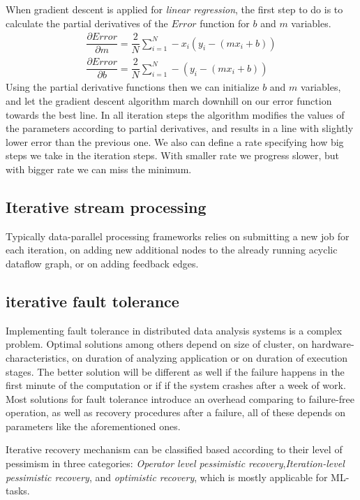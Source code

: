 When gradient descent is applied for \textit{linear regression}, the first step to do is to calculate the partial derivatives of the $Error$ function for  $b$ and $m$ variables.
\begin{align}
\dfrac{\partial Error}{\partial m} = \dfrac{2}{N}\sum_{i=1}^{N} -x_i(y_i-(mx_i+b)) \\
\dfrac{\partial Error}{\partial b} = \dfrac{2}{N}\sum_{i=1}^{N} -(y_i-(mx_i+b))
\end{align}
Using the partial derivative functions then we can initialize $b$ and $m$ variables, and let the gradient descent  algorithm march downhill on our error function towards the best line. In all iteration steps the algorithm modifies the values of the parameters according to partial derivatives, and results in a line with slightly lower error than the previous one. We also can define a rate specifying how big steps we take in the iteration steps. With smaller rate we progress slower, but with bigger rate we can miss the minimum. 
\cite{gradientdescent}%
\subsection{Iterative stream processing}
Typically data-parallel processing frameworks relies on  submitting a new job for each iteration, on adding new additional nodes to the already running acyclic dataflow graph, or on adding feedback edges. 
\subsection{iterative fault tolerance}
Implementing fault tolerance in distributed data analysis systems is a complex problem. Optimal solutions\cite{allroadsleadtorome} among others depend on size of cluster, on hardware-characteristics, on duration of analyzing application or on duration of execution stages. The better solution will be different  as well if the failure happens in the first minute of the computation or if if the system crashes after a week of work.
Most solutions for fault tolerance introduce an overhead comparing to failure-free operation, as well as recovery procedures after a failure, all of these depends on parameters like the aforementioned ones.

Iterative recovery mechanism can be classified based according to their level of pessimism in three categories\cite{allroadsleadtorome}: \textit{Operator level pessimistic recovery},\textit{Iteration-level pessimistic recovery}, and \textit{optimistic recovery}, which is mostly applicable for ML-tasks. 

